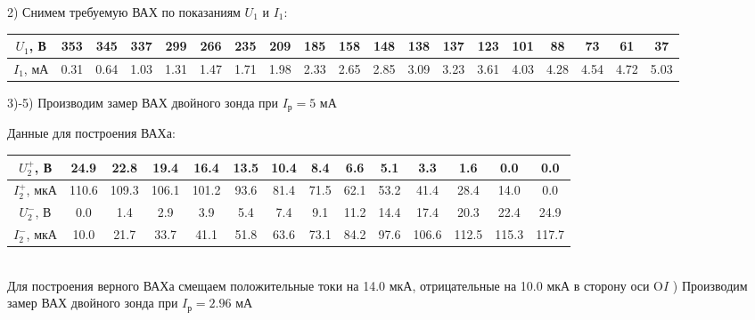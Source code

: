 \documentclass[a4paper,12pt]{extarticle}
\begin{document}
2) Снимем требуемую ВАХ по показаниям $U_1$ и $I_1$:

\begin{tabular}{|c|c|c|c|c|c|c|c|c|c|c|c|c|c|c|c|c|c|c|}
\hline
$U_1$, В & 353  & 345  & 337  & 299  & 266  & 235  & 209  & 185  & 158  & 148  & 138  & 137  & 123  & 101  & 88   & 73   & 61   & 37   \\ \hline
$I_1$, мА & 0.31 & 0.64 & 1.03 & 1.31 & 1.47 & 1.71 & 1.98 & 2.33 & 2.65 & 2.85 & 3.09 & 3.23 & 3.61 & 4.03 & 4.28 & 4.54 & 4.72 & 5.03 \\ \hline
\end{tabular}

3)-5) Производим замер ВАХ двойного зонда при $I_{\text{р}} = 5$ мА

\begin{minipage}{1\textwidth}
\end{minipage}
Данные для построения ВАХа: \\
\begin{tabular}{|c|c|c|c|c|c|c|c|c|c|c|c|c|c|}
\hline
$U_2^+$, В   & 24.9  & 22.8  & 19.4  & 16.4  & 13.5 & 10.4 & 8.4  & 6.6  & 5.1  & 3.3   & 1.6   & 0.0   & 0.0   \\ \hline
$I_2^+$, мкА  & 110.6 & 109.3 & 106.1 & 101.2 & 93.6 & 81.4 & 71.5 & 62.1 & 53.2 & 41.4  & 28.4  & 14.0  & 0.0  \\ \hline
$U_2^-$, В & 0.0   & 1.4   & 2.9   & 3.9   & 5.4  & 7.4  & 9.1  & 11.2 & 14.4 & 17.4  & 20.3  & 22.4  & 24.9  \\ \hline
$I_2^-$, мкА & 10.0  & 21.7  & 33.7  & 41.1  & 51.8 & 63.6 & 73.1 & 84.2 & 97.6 & 106.6 & 112.5 & 115.3 & 117.7 \\ \hline
\end{tabular} \\
Для построения верного ВАХа смещаем положительные токи на 14.0 мкА, отрицательные на 10.0 мкА в сторону оси O$I$
) Производим замер ВАХ двойного зонда при $I_{\text{р}} = 2.96$ мА
\end{document}
